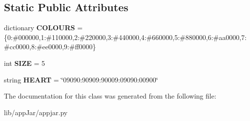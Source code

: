 \subsection*{Static Public Attributes}
\begin{DoxyCompactItemize}
\item 
\mbox{\label{classappjar_1_1_micro_bit_simulator_af17b831dd6b3c698643183671cdaeb88}} 
dictionary {\bfseries C\+O\+L\+O\+U\+RS} = \{0\+:\textquotesingle{}\#000000\textquotesingle{},1\+:\textquotesingle{}\#110000\textquotesingle{},2\+:\textquotesingle{}\#220000\textquotesingle{},3\+:\textquotesingle{}\#440000\textquotesingle{},4\+:\textquotesingle{}\#660000\textquotesingle{},5\+:\textquotesingle{}\#880000\textquotesingle{},6\+:\textquotesingle{}\#aa0000\textquotesingle{},7\+:\textquotesingle{}\#cc0000\textquotesingle{},8\+:\textquotesingle{}\#ee0000\textquotesingle{},9\+:\textquotesingle{}\#ff0000\textquotesingle{}\}
\item 
\mbox{\label{classappjar_1_1_micro_bit_simulator_aa8dd0877feaa3303bcc1249b9818ce8f}} 
int {\bfseries S\+I\+ZE} = 5
\item 
\mbox{\label{classappjar_1_1_micro_bit_simulator_a4b79933f425e6d3075b68711e6cd9f36}} 
string {\bfseries H\+E\+A\+RT} = \char`\"{}09090\+:90909\+:90009\+:09090\+:00900\char`\"{}
\end{DoxyCompactItemize}


The documentation for this class was generated from the following file\+:\begin{DoxyCompactItemize}
\item 
lib/app\+Jar/appjar.\+py\end{DoxyCompactItemize}
